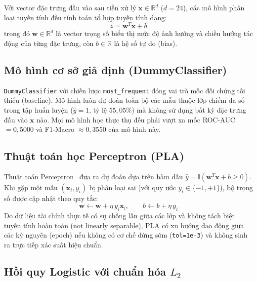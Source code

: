 \documentclass[12pt,a4paper,oneside]{report}
\begin{document}
Với vector đặc trưng đầu vào sau tiền xử lý $\mathbf{x} \in \mathbb{R}^d$ ($d = 24$), các mô hình phân loại tuyến tính đều tính toán tổ hợp tuyến tính dạng:
\begin{equation}
  z = \mathbf{w}^T \mathbf{x} + b
  \label{eq:linear_score}
\end{equation}
trong đó $\mathbf{w} \in \mathbb{R}^d$ là vector trọng số biểu thị mức độ ảnh hưởng và chiều hướng tác động của từng đặc trưng, còn $b \in \mathbb{R}$ là hệ số tự do (bias).

\subsection{Mô hình cơ sở giả định (DummyClassifier)}

\texttt{DummyClassifier} với chiến lược \texttt{most\_frequent} đóng vai trò mốc đối chứng tối thiểu (baseline). Mô hình luôn dự đoán toàn bộ các mẫu thuộc lớp chiếm đa số trong tập huấn luyện ($\hat{y} = 1$, tỷ lệ $55{,}05\%$) mà không sử dụng bất kỳ đặc trưng đầu vào $\mathbf{x}$ nào. Mọi mô hình học thực thụ đều phải vượt xa mốc ROC-AUC $= 0{,}5000$ và F1-Macro $\approx 0{,}3550$ của mô hình này.

\subsection{Thuật toán học Perceptron (PLA)}

Thuật toán Perceptron~\cite{rosenblatt1958} đưa ra dự đoán dựa trên hàm dấu $\hat{y} = \mathbb{I}(\mathbf{w}^T \mathbf{x} + b \ge 0)$. Khi gặp một mẫu $(\mathbf{x}_i, y_i)$ bị phân loại sai (với quy ước $y_i \in \{-1, +1\}$), bộ trọng số được cập nhật theo quy tắc:
\begin{equation}
  \mathbf{w} \leftarrow \mathbf{w} + \eta\, y_i \mathbf{x}_i, \qquad b \leftarrow b + \eta\, y_i
  \label{eq:pla_update}
\end{equation}
Do dữ liệu tài chính thực tế có sự chồng lấn giữa các lớp và không tách biệt tuyến tính hoàn toàn (not linearly separable), PLA có xu hướng dao động giữa các kỷ nguyên (epoch) nếu không có cơ chế dừng sớm (\texttt{tol=1e-3}) và không sinh ra trực tiếp xác suất hiệu chuẩn.

\subsection{Hồi quy Logistic với chuẩn hóa \texorpdfstring{$L_2$}{L2}}
\end{document}
